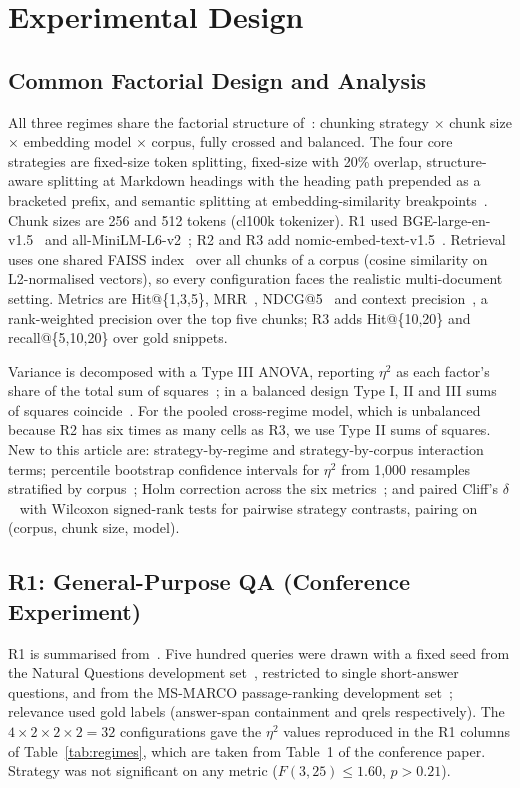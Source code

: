 \documentclass[runningheads]{llncs}
\begin{document}
\section{Experimental Design}
\label{sec:design}

\subsection{Common Factorial Design and Analysis}
All three regimes share the factorial structure of~\cite{chauhan2026chunking}: chunking strategy $\times$ chunk size $\times$ embedding model $\times$ corpus, fully crossed and balanced. The four core strategies are fixed-size token splitting, fixed-size with 20\% overlap, structure-aware splitting at Markdown headings with the heading path prepended as a bracketed prefix, and semantic splitting at embedding-similarity breakpoints~\cite{kamradt2023}. Chunk sizes are 256 and 512 tokens (cl100k tokenizer). R1 used BGE-large-en-v1.5~\cite{xiao2023cpack} and all-MiniLM-L6-v2~\cite{reimers2019sbert}; R2 and R3 add nomic-embed-text-v1.5~\cite{nussbaum2024nomic}. Retrieval uses one shared FAISS index~\cite{johnson2021faiss} over all chunks of a corpus (cosine similarity on L2-normalised vectors), so every configuration faces the realistic multi-document setting. Metrics are Hit@\{1,3,5\}, MRR~\cite{craswell2009mrr}, NDCG@5~\cite{jarvelin2002ndcg} and context precision~\cite{es2024ragas}, a rank-weighted precision over the top five chunks; R3 adds Hit@\{10,20\} and recall@\{5,10,20\} over gold snippets.

Variance is decomposed with a Type III ANOVA, reporting $\eta^2$ as each factor's share of the total sum of squares~\cite{richardson2011,olejnik2003,lakens2013}; in a balanced design Type I, II and III sums of squares coincide~\cite{langsrud2003}. For the pooled cross-regime model, which is unbalanced because R2 has six times as many cells as R3, we use Type II sums of squares. New to this article are: strategy-by-regime and strategy-by-corpus interaction terms; percentile bootstrap confidence intervals for $\eta^2$ from 1,000 resamples stratified by corpus~\cite{efron1986bootstrap}; Holm correction across the six metrics~\cite{holm1979}; and paired Cliff's $\delta$~\cite{cliff1993} with Wilcoxon signed-rank tests for pairwise strategy contrasts, pairing on (corpus, chunk size, model).

\subsection{R1: General-Purpose QA (Conference Experiment)}
\label{sec:r1}
R1 is summarised from~\cite{chauhan2026chunking}. Five hundred queries were drawn with a fixed seed from the Natural Questions development set~\cite{kwiatkowski2019nq}, restricted to single short-answer questions, and from the MS-MARCO passage-ranking development set~\cite{nguyen2016msmarco}; relevance used gold labels (answer-span containment and qrels respectively). The $4\times2\times2\times2=32$ configurations gave the $\eta^2$ values reproduced in the R1 columns of Table~\ref{tab:regimes}, which are taken from Table~1 of the conference paper. Strategy was not significant on any metric ($F(3,25)\le 1.60$, $p>0.21$).
\end{document}
